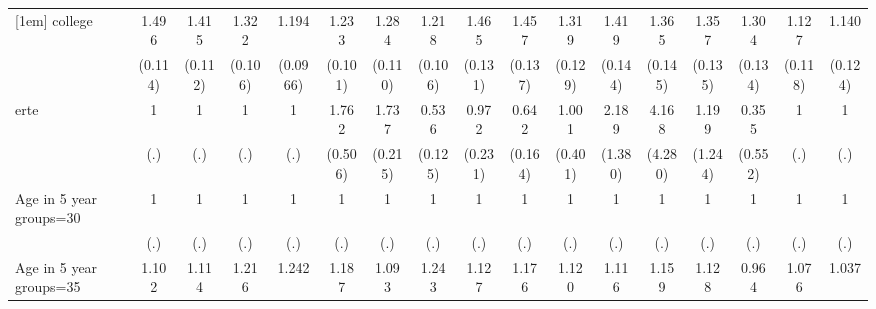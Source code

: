 {\begin{tabular}{l*{16}{c}}
[1em]
college             &       1.496\sym{***}&       1.415\sym{***}&       1.322\sym{***}&       1.194\sym{*}  &       1.233\sym{*}  &       1.284\sym{**} &       1.218\sym{*}  &       1.465\sym{***}&       1.457\sym{***}&       1.319\sym{**} &       1.419\sym{***}&       1.365\sym{**} &       1.357\sym{**} &       1.304\sym{**} &       1.127         &       1.140         \\
                    &     (0.114)         &     (0.112)         &     (0.106)         &    (0.0966)         &     (0.101)         &     (0.110)         &     (0.106)         &     (0.131)         &     (0.137)         &     (0.129)         &     (0.144)         &     (0.145)         &     (0.135)         &     (0.134)         &     (0.118)         &     (0.124)         \\
[1em]
erte                &           1         &           1         &           1         &           1         &       1.762\sym{*}  &       1.737\sym{***}&       0.536\sym{**} &       0.972         &       0.642         &       1.001         &       2.189         &       4.168         &       1.199         &       0.355         &           1         &           1         \\
                    &         (.)         &         (.)         &         (.)         &         (.)         &     (0.506)         &     (0.215)         &     (0.125)         &     (0.231)         &     (0.164)         &     (0.401)         &     (1.380)         &     (4.280)         &     (1.244)         &     (0.552)         &         (.)         &         (.)         \\
[1em]
Age in 5 year groups=30&           1         &           1         &           1         &           1         &           1         &           1         &           1         &           1         &           1         &           1         &           1         &           1         &           1         &           1         &           1         &           1         \\
                    &         (.)         &         (.)         &         (.)         &         (.)         &         (.)         &         (.)         &         (.)         &         (.)         &         (.)         &         (.)         &         (.)         &         (.)         &         (.)         &         (.)         &         (.)         &         (.)         \\
[1em]
Age in 5 year groups=35&       1.102         &       1.114         &       1.216\sym{**} &       1.242\sym{***}&       1.187\sym{**} &       1.093         &       1.243\sym{**} &       1.127         &       1.176\sym{*}  &       1.120         &       1.116         &       1.159         &       1.128         &       0.964         &       1.076         &       1.037         \\

\end{tabular}}

